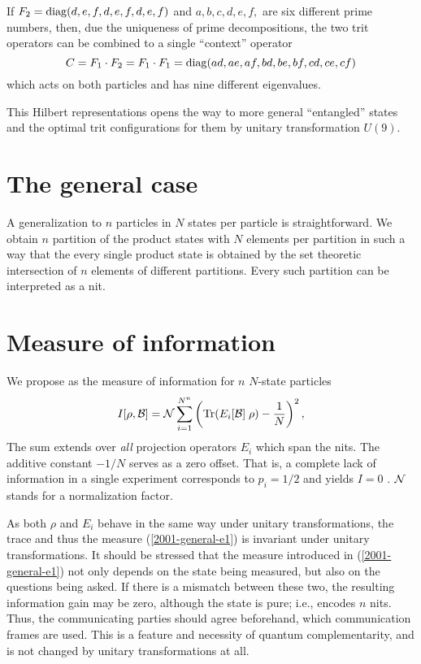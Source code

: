 If $F_2= {\rm diag} (d,e,f,d,e,f,d,e,f)$
and $a,b,c,d,e,f,$ are six different prime numbers,
then, due the uniqueness of prime decompositions,
the two trit operators
can be combined to a single
``context'' operator
\begin{equation}
C=F_1\cdot F_2=F_1\cdot F_1=
{\rm diag} (ad,ae,af,bd,be,bf,cd,ce,cf)
\label{2001-general-ps3pd}
\end{equation}
which acts on both particles and has nine different eigenvalues.



This Hilbert representations opens the way to more general ``entangled''
states and the optimal trit configurations for them by
unitary transformation $U(9)$.

\section{The general case}
A generalization to $n$ particles in $N$ states per particle is straightforward.
We obtain $n$ partition of the product states with $N$ elements per partition in such a way that
the every single product state is obtained by the set theoretic intersection of
$n$ elements of different partitions.
Every such partition can be interpreted as a nit.


\section{Measure of information}
We propose as the
measure of information for  $n$ $N$-state particles
\begin{equation}
I[\rho ,{\cal B} ]={\cal N}\sum_{i=1}^{N^n} \left({\rm Tr} (E_i[{\cal B}]\;\rho) - {1 \over N} \right)^2,
\label{2001-general-e1}
\end{equation}
The sum extends over {\em all} projection operators $E_i$ which span the nits.
The additive constant $-1/N$ serves as a zero offset.
That is, a complete lack of information in a single experiment corresponds to  $p_i=1/2$ and yields $I=0$ \cite{zeil-99}.
${\cal N}$ stands for a normalization factor.

As both $\rho$ and $E_i$ behave in the same way under unitary transformations, the trace
and thus the measure (\ref{2001-general-e1}) is invariant under unitary transformations.
It should be stressed that the measure introduced in (\ref{2001-general-e1})
not only depends on the state being measured, but also on the questions being asked.
If there is a mismatch between these two, the resulting information gain may be zero,
although the state is pure; i.e., encodes  $n$ nits.
Thus, the communicating parties should agree beforehand, which communication frames are used.
This is a feature and necessity of quantum complementarity,
and is not changed by unitary transformations at all.




